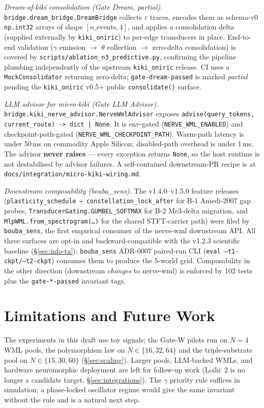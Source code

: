 \documentclass[10pt,twocolumn]{article}
\begin{document}
\textit{Dream-of-kiki consolidation (Gate Dream, partial).}
\texttt{bridge.dream\_bridge.DreamBridge} collects $\varepsilon$ traces,
encodes them as schema-v0 \texttt{np.int32} arrays of shape
$[n\_\text{events}, 4]$, and applies a consolidation delta (supplied
externally by \texttt{kiki\_oniric}) to per-edge transducers in place.
End-to-end validation ($\gamma$ emission $\to$ $\theta$ collection
$\to$ zero-delta consolidation) is covered by
\texttt{scripts/ablation\_n3\_predictive.py}, confirming the pipeline
plumbing independently of the upstream \texttt{kiki\_oniric} release.
CI uses a \texttt{MockConsolidator} returning zero-delta;
\texttt{gate-dream-passed} is marked \emph{partial} pending the
\texttt{kiki\_oniric} v0.5+ public \texttt{consolidate()} surface.

\textit{LLM advisor for micro-kiki (Gate LLM Advisor).}
\texttt{bridge.kiki\_nerve\_advisor.NerveWmlAdvisor} exposes
\texttt{advise(query\_tokens, current\_route) -> dict | None}.
It is env-gated (\texttt{NERVE\_WML\_ENABLED}) and
checkpoint-path-gated (\texttt{NERVE\_WML\_CHECKPOINT\_PATH}). Warm-path
latency is under 50\,ms on commodity Apple Silicon; disabled-path
overhead is under 1\,ms. The advisor \textbf{never raises} --- every
exception returns \texttt{None}, so the host runtime is not destabilised
by advisor failures. A self-contained downstream-PR recipe is at
\texttt{docs/integration/micro-kiki-wiring.md}.

\textit{Downstream composability (bouba\_sens).}
The v1.4.0--v1.5.0 feature releases (\texttt{plasticity\_schedule} +
\texttt{constellation\_lock\_after} for B-1 Amedi-2007 gap probes,
\texttt{TransducerGating.GUMBEL\_SOFTMAX} for B-2 Me3-delta migration,
and \texttt{MlpWML.from\_spectrogram(\ldots)} for the shared STFT-carrier
path) were filed by \texttt{bouba\_sens}, the first empirical consumer
of the nerve-wml downstream API. All three surfaces are opt-in and
backward-compatible with the v1.2.3 scientific baseline
(\S\ref{sec:info-tx}); \texttt{bouba\_sens} ADR-0007 paired-run CLI
(\texttt{eval --t1-ckpt/--t2-ckpt}) consumes them to produce the
5-world grid. Composability in the other direction (downstream
\emph{changes} to nerve-wml) is enforced by 102 tests plus the
\texttt{gate-*-passed} invariant tags.

\section{Limitations and Future Work}
\label{sec:limitations}
The experiments in this draft use toy signals; the Gate-W pilots
run on $N=4$ WML pools, the polymorphism law on
$N \in \{16, 32, 64\}$ and the triple-substrate pool on
$N \in \{15, 30, 60\}$ (\S\ref{sec:scaling}). Larger pools,
LLM-backed WMLs, and hardware neuromorphic deployment are left for
follow-up work (Loihi~2 is no longer a candidate target,
\S\ref{sec:integrations}). The $\gamma$
priority rule suffices in simulation; a phase-locked oscillator
regime would give the same invariant without the rule and is a
natural next step.
\end{document}
